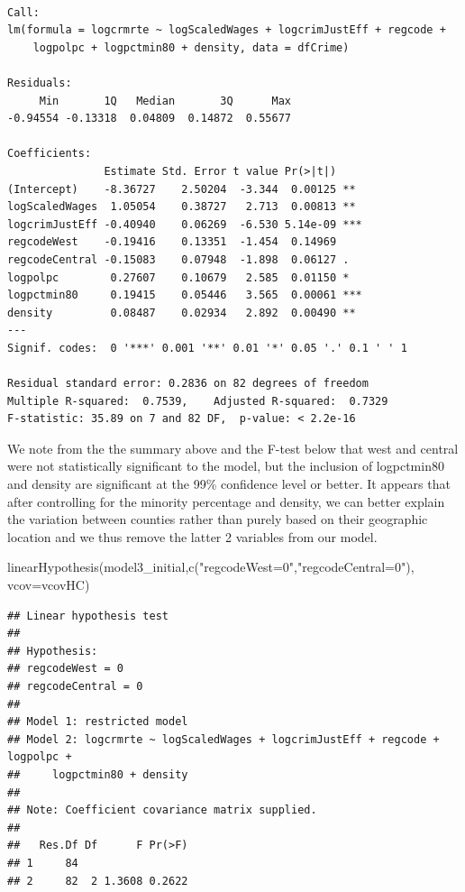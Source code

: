 \documentclass[]{article}
\newenvironment{Shaded}{}{}
\newcommand{\DataTypeTok}[1]{#1}
\newcommand{\KeywordTok}[1]{\textcolor[rgb]{0.00,0.00,1.00}{#1}}
\newcommand{\NormalTok}[1]{#1}
\newcommand{\StringTok}[1]{\textcolor[rgb]{0.00,0.50,0.50}{#1}}
\begin{document}
\begin{verbatim}

Call:
lm(formula = logcrmrte ~ logScaledWages + logcrimJustEff + regcode + 
    logpolpc + logpctmin80 + density, data = dfCrime)

Residuals:
     Min       1Q   Median       3Q      Max 
-0.94554 -0.13318  0.04809  0.14872  0.55677 

Coefficients:
               Estimate Std. Error t value Pr(>|t|)    
(Intercept)    -8.36727    2.50204  -3.344  0.00125 ** 
logScaledWages  1.05054    0.38727   2.713  0.00813 ** 
logcrimJustEff -0.40940    0.06269  -6.530 5.14e-09 ***
regcodeWest    -0.19416    0.13351  -1.454  0.14969    
regcodeCentral -0.15083    0.07948  -1.898  0.06127 .  
logpolpc        0.27607    0.10679   2.585  0.01150 *  
logpctmin80     0.19415    0.05446   3.565  0.00061 ***
density         0.08487    0.02934   2.892  0.00490 ** 
---
Signif. codes:  0 '***' 0.001 '**' 0.01 '*' 0.05 '.' 0.1 ' ' 1

Residual standard error: 0.2836 on 82 degrees of freedom
Multiple R-squared:  0.7539,    Adjusted R-squared:  0.7329 
F-statistic: 35.89 on 7 and 82 DF,  p-value: < 2.2e-16
\end{verbatim}

We note from the the summary above and the F-test below that west and
central were not statistically significant to the model, but the
inclusion of logpctmin80 and density are significant at the 99\%
confidence level or better. It appears that after controlling for the
minority percentage and density, we can better explain the variation
between counties rather than purely based on their geographic location
and we thus remove the latter 2 variables from our model.

\begin{Shaded}
\begin{Highlighting}[]
\KeywordTok{linearHypothesis}\NormalTok{(model3_initial,}\KeywordTok{c}\NormalTok{(}\StringTok{"regcodeWest=0"}\NormalTok{,}\StringTok{"regcodeCentral=0"}\NormalTok{), }\DataTypeTok{vcov=}\NormalTok{vcovHC)}
\end{Highlighting}
\end{Shaded}

\begin{verbatim}
## Linear hypothesis test
## 
## Hypothesis:
## regcodeWest = 0
## regcodeCentral = 0
## 
## Model 1: restricted model
## Model 2: logcrmrte ~ logScaledWages + logcrimJustEff + regcode + logpolpc + 
##     logpctmin80 + density
## 
## Note: Coefficient covariance matrix supplied.
## 
##   Res.Df Df      F Pr(>F)
## 1     84                 
## 2     82  2 1.3608 0.2622
\end{verbatim}
\end{document}
